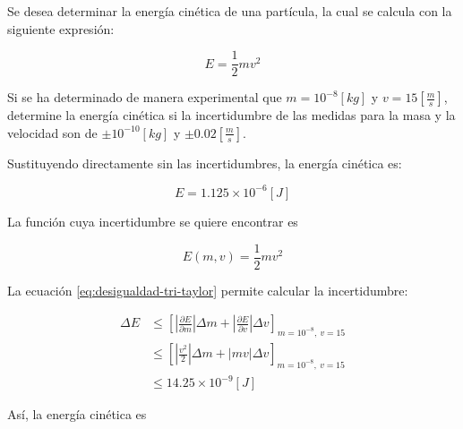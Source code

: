 \begin{ex}

    Se desea determinar la energía cinética de una partícula, la cual se
    calcula con la siguiente expresión:

    \begin{equation*}
        E = \frac{1}{2} m v^2
    \end{equation*}

    Si se ha determinado de manera experimental que \(m = 10^{-8} [\si{kg}]\)
    y \(v = 15 \left[\si{ \frac{m}{s} } \right]\), determine la energía
    cinética si la incertidumbre de las medidas para la masa y la velocidad son
    de \(\pm 10^{-10} [\si{kg}]\) y $\pm 0.02 \left[ \si{\frac{m}{s}}
    \right]$.

    \begin{solution}

        Sustituyendo directamente sin las incertidumbres, la energía cinética
        es:

        \begin{equation*}
            E = 1.125 \times 10^{-6} [\si{J}]
        \end{equation*}

        La función cuya incertidumbre se quiere encontrar es

        \begin{equation*}
            E(m, v) = \frac{1}{2} m v^2
        \end{equation*}

        La ecuación \ref{eq:desigualdad-tri-taylor} permite calcular la
        incertidumbre:

        \begin{align*}
            \Delta E &\leq \left[ \left| \frac{\partial E}{\partial m}
                \right| \Delta m + \left| \frac{\partial E}{\partial v}
            \right| \Delta v \right]_{m = 10^{-8},\ v = 15}\\
                     &\leq \left[ \left| \frac{v^2}{2}
                         \right| \Delta m + \left| m v \right| \Delta v
                     \right]_{m = 10^{-8},\ v = 15} \\
                     &\leq 14.25 \times 10^{-9} [\si{J}]
            \end{align*}

            Así, la energía cinética es

            \begin{center}
            \end{center}

        \end{solution}
    \end{ex}

